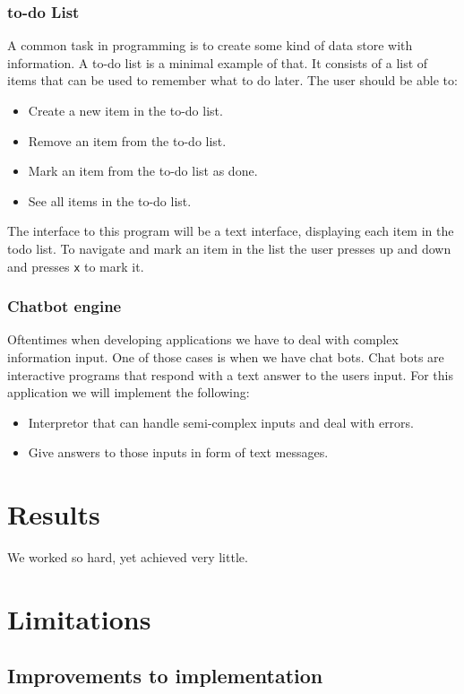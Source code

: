 \documentclass[12pt]{article}
\theoremstyle{definition}
\theoremstyle{theorem}
\begin{document}
\subsubsection{to-do List}

A common task in programming is to create some kind of data store with
information. A to-do list is a minimal example of that. It consists of a list of
items that can be used to remember what to do later. The user should be able to:

\begin{itemize}
    \item Create a new item in the to-do list.
    \item Remove an item from the to-do list.
    \item Mark an item from the to-do list as done.
    \item See all items in the to-do list.
\end{itemize}

The interface to this program will be a text interface, displaying each item in
the todo list. To navigate and mark an item in the list the user presses up and
down and presses \texttt{x} to mark it.

\subsubsection{Chatbot engine}

Oftentimes when developing applications we have to deal with complex information
input. One of those cases is when we have chat bots. Chat bots are interactive
programs that respond with a text answer to the users input. For this
application we will implement the following:

\begin{itemize}
    \item Interpretor that can handle semi-complex inputs and deal with errors.
    \item Give answers to those inputs in form of text messages.
\end{itemize}    

\section{Results}\label{results}
We worked so hard, yet achieved very little.

\section{Limitations}\label{limitations}

\subsection{Improvements to implementation}



\end{document}

